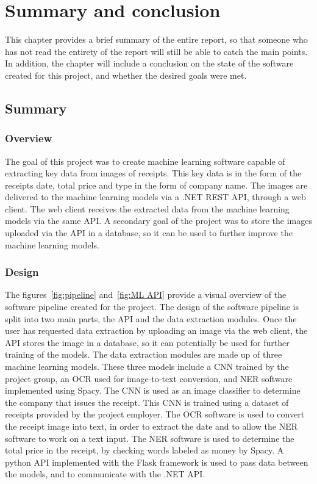\chapter{Summary and conclusion}
\label{ch:summaryandconclusion}
This chapter provides a brief summary of the entire report, so that someone who has not read the entirety of the report will still be able to catch the main points.
In addition, the chapter will include a conclusion on the state of the software created for this project, and whether the desired goals were met.

\section{Summary}\label{sec:summary}
\subsection{Overview}\label{subsec:overview}
The goal of this project was to create machine learning software capable of extracting key data from images of receipts.
This key data is in the form of the receipts date, total price and type in the form of company name.
The images are delivered to the machine learning models via a .NET REST API, through a web client.
The web client receives the extracted data from the machine learning models via the same API.
A secondary goal of the project was to store the images uploaded via the API in a database, so it can be used to further improve the machine learning models.

\subsection{Design}\label{subsec:design}
The figures~\ref{fig:pipeline} and~\ref{fig:ML API} provide a visual overview of the software pipeline
created for the project.
The design of the software pipeline is split into two main parts, the API and the data extraction modules.
Once the user has requested data extraction by uploading an image via the web client, the API stores the image in a database, so it can potentially be used for further training of the models.
The data extraction modules are made up of three machine learning models.
These three models include a CNN trained by the project group, an OCR used for image-to-text conversion, and NER software implemented using Spacy.
The CNN is used as an image classifier to determine the company that issues the receipt.
This CNN is trained using a dataset of receipts provided by the project employer.
The OCR software is used to convert the receipt image into text, in order to extract the date and to allow the NER software to work on a text input.
The NER software is used to determine the total price in the receipt, by checking words labeled as money by Spacy.
A python API implemented with the Flask framework is used to pass data between the models, and to communicate with the .NET API.

